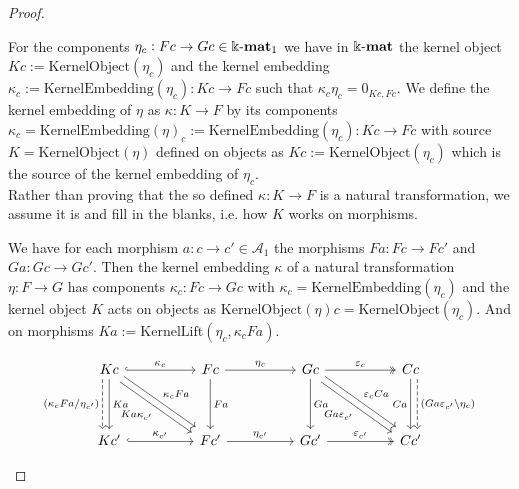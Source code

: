 \begin{proof}
\begin{enumerate}
\begin{subproof}
For the components $\eta_{c} : Fc \rightarrow Gc \in \Bbbk\textnormal{-}\mathbf{mat}_{1}$ we have in $\Bbbk\textnormal{-}\mathbf{mat}$ the kernel object $Kc := \mathrm{KernelObject}(\eta_{c})$
and the kernel embedding
$\kappa_{c} := \mathrm{KernelEmbedding}(\eta_{c}) : Kc \rightarrow Fc$ such that
$\kappa_{c} \eta_{c} = 0_{Kc,Fc}$.
We define the kernel embedding of $\eta$ as $\kappa : K \rightarrow F$ by its components
$\kappa_{c} = \mathrm{KernelEmbedding}(\eta)_{c} := \mathrm{KernelEmbedding}(\eta_{c}) : Kc \rightarrow Fc$ with source
$K = \mathrm{KernelObject}(\eta)$ defined on objects as $Kc := \mathrm{KernelObject}(\eta_{c})$ which is the source of the
kernel embedding of $\eta_{c}$.\\
Rather than proving that the so defined $\kappa : K \rightarrow F$ is a natural transformation, we assume it is and fill in the blanks, i.e. 
how $K$ works on morphisms.

We have for each morphism $a : c \rightarrow c' \in \mathcal{A}_{1}$ the morphisms $Fa : Fc \rightarrow Fc'$ and
$Ga : Gc \rightarrow Gc'$. Then the kernel embedding $\kappa$ of a natural transformation $\eta : F \rightarrow G$ has components
$\kappa_{c} : Fc \rightarrow Gc$ with $\kappa_{c} = \mathrm{KernelEmbedding}(\eta_{c})$ and the kernel object $K$ acts on objects
as $\mathrm{KernelObject}(\eta)c = \mathrm{KernelObject}(\eta_{c})$.
And on morphisms $Ka := \mathrm{KernelLift}(\eta_{c},\kappa_{c}Fa)$.

\[
\begin{tikzcd}
Kc \arrow[dd, "Ka"] \arrow[rr, "\kappa_{c}", hook] \arrow[rrdd, "\kappa_{c}Fa", shift left] \arrow[rrdd, "Ka\kappa_{c'}"', shift right] \arrow[dd, "(\kappa_{c}Fa/\eta_{c'})"', dashed, shift right=2] &  & Fc \arrow[rr, "\eta_{c}"] \arrow[dd, "Fa"] &  & Gc \arrow[dd, "Ga"] \arrow[rr, "\varepsilon_{c}", two heads] \arrow[rrdd, "Ga\varepsilon_{c'}"', shift right] \arrow[rrdd, "\varepsilon_{c}Ca", shift left] &  & Cc \arrow[dd, "Ca"'] \arrow[dd, "(Ga\varepsilon_{c'}\backslash \eta_{c})", dashed, shift left=2] \\
                                                                                                                                                                                                       &  &                                            &  &                                                                                                                                                             &  &                                                                                                  \\
Kc' \arrow[rr, "\kappa_{c'}", hook]                                                                                                                                                                    &  & Fc' \arrow[rr, "\eta_{c'}"]                &  & Gc' \arrow[rr, "\varepsilon_{c'}", two heads]                                                                                                               &  & Cc'                                                                                             
\end{tikzcd}
\]



\end{subproof}
\end{enumerate}
\end{proof}
